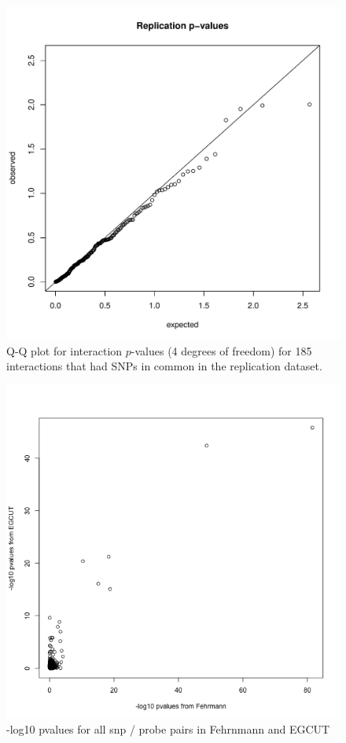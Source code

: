 \documentclass[paper=a4, fontsize=11pt]{scrartcl}	%
\numberwithin{equation}{section}									%
\numberwithin{figure}{section}										%
\numberwithin{table}{section}										%
\begin{document}
\begin{figure}[p]
	\centering
	\includegraphics[width=15cm]{images/replication_qqplot}
	\caption{Q-Q plot for interaction $p$-values (4 degrees of freedom) for 185 interactions that had SNPs in common in the replication dataset.}
	\label{fig:gg_replication}
\end{figure}



\begin{figure}[p]
	\centering
	\includegraphics[width=15cm]{images/EGCUT_vs_Fehrmann_all}
	\caption{-log10 pvalues for all snp / probe pairs in Fehrnmann and EGCUT}
	\label{fig:repl_match}
\end{figure}
\end{document}
